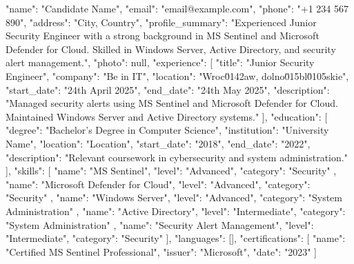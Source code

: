 {
  "name": "Candidate Name",
  "email": "email@example.com",
  "phone": "+1 234 567 890",
  "address": "City, Country",
  "profile_summary": "Experienced Junior Security Engineer with a strong background in MS Sentinel and Microsoft Defender for Cloud. Skilled in Windows Server, Active Directory, and security alert management.",
  "photo": null,
  "experience": [
    {
      "title": "Junior Security Engineer",
      "company": "Be in IT",
      "location": "Wroc\u0142aw, dolno\u015bl\u0105skie",
      "start_date": "24th April 2025",
      "end_date": "24th May 2025",
      "description": "Managed security alerts using MS Sentinel and Microsoft Defender for Cloud. Maintained Windows Server and Active Directory systems."
    }
  ],
  "education": [
    {
      "degree": "Bachelor's Degree in Computer Science",
      "institution": "University Name",
      "location": "Location",
      "start_date": "2018",
      "end_date": "2022",
      "description": "Relevant coursework in cybersecurity and system administration."
    }
  ],
  "skills": [
    {
      "name": "MS Sentinel",
      "level": "Advanced",
      "category": "Security"
    },
    {
      "name": "Microsoft Defender for Cloud",
      "level": "Advanced",
      "category": "Security"
    },
    {
      "name": "Windows Server",
      "level": "Advanced",
      "category": "System Administration"
    },
    {
      "name": "Active Directory",
      "level": "Intermediate",
      "category": "System Administration"
    },
    {
      "name": "Security Alert Management",
      "level": "Intermediate",
      "category": "Security"
    }
  ],
  "languages": [],
  "certifications": [
    {
      "name": "Certified MS Sentinel Professional",
      "issuer": "Microsoft",
      "date": "2023"
    }
  ]
}